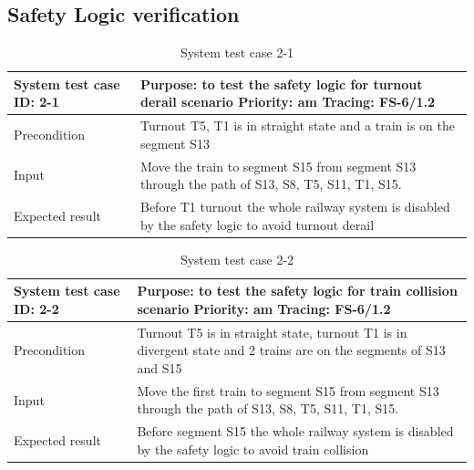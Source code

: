 \subsection{Safety Logic verification}
\begin{table}[H]
	\caption{System test case 2-1}
	\label{table:TCase-FSS2-1}
	\begin{center}
		\renewcommand{\arraystretch}{1.8}
		\begin{tabu} 
			to 0.9 \textwidth
			{  X[0.3, l] X[l] }
			\toprule
			System test case ID: 2-1 & Purpose: to test the safety logic for turnout derail scenario   \newline Priority: am \newline Tracing: FS-6/1.2 \\ \midrule
			Precondition             & Turnout T5, T1 is in straight state and a train is on the segment S13                                            \\
			Input                    & Move the train to segment S15 from segment S13 through the path of S13, S8, T5, S11, T1, S15.                    \\
			Expected result          & Before T1 turnout the whole railway system is disabled by the safety logic to avoid turnout derail               \\ \bottomrule
		\end{tabu}
	\end{center}
\end{table}

\begin{table}[H]
	\caption{System test case 2-2}
	\label{table:TCase-FSS2-2}
	\begin{center}
		\renewcommand{\arraystretch}{1.8}
		\begin{tabu} 
			to 0.9 \textwidth
			{  X[0.3, l] X[l] }
			\toprule
			System test case ID: 2-2 & Purpose: to test the safety logic for train collision scenario \newline Priority: am \newline Tracing: FS-6/1.2   \\ \midrule
			Precondition             & Turnout T5 is in straight state, turnout T1 is in divergent state and 2 trains are on the segments of S13 and S15 \\
			Input                    & Move the first train to segment S15 from segment S13 through the path of S13, S8, T5, S11, T1, S15.               \\
			Expected result          & Before segment S15 the whole railway system is disabled by the safety logic to avoid train collision              \\ \bottomrule
		\end{tabu}
	\end{center}
\end{table}